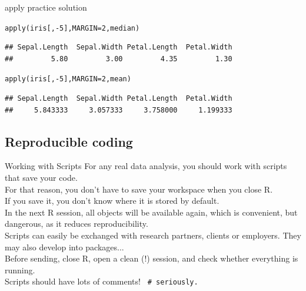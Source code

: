\documentclass[xcolor=table,           xcolor=dvipsnames]{beamer}\usepackage[]{graphicx}\usepackage[]{color}
\makeatletter
\newcommand{\hlnum}[1]{\textcolor[rgb]{0,0,0}{#1}}
\newcommand{\hlopt}[1]{\textcolor[rgb]{0,0,0}{#1}}
\newcommand{\hlstd}[1]{\textcolor[rgb]{0,0,0}{#1}}
\newcommand{\hlkwc}[1]{\textcolor[rgb]{1,0,1}{#1}}
\newcommand{\hlkwd}[1]{\textcolor[rgb]{0,0,1}{#1}}
\newenvironment{kframe}{%
 \def\at@end@of@kframe{}%
 \ifinner\ifhmode%
  \def\at@end@of@kframe{\end{minipage}}%
  \begin{minipage}{\columnwidth}%
 \fi\fi%
 \def\FrameCommand##1{\hskip\@totalleftmargin \hskip-\fboxsep
 \colorbox{shadecolor}{##1}\hskip-\fboxsep
     \hskip-\linewidth \hskip-\@totalleftmargin \hskip\columnwidth}%
 \MakeFramed {\advance\hsize-\width
   \@totalleftmargin\z@ \linewidth\hsize
   \@setminipage}}%
 {\par\unskip\endMakeFramed%
 \at@end@of@kframe}
\newenvironment{knitrout}{}{} %
\makeatother
\begin{document}

\begin{frame}[fragile]{apply practice solution}
\begin{knitrout}
\color{fgcolor}\begin{kframe}
\begin{alltt}
\hlkwd{apply}\hlstd{(iris[ ,}\hlopt{-}\hlnum{5}\hlstd{],} \hlkwc{MARGIN}\hlstd{=}\hlnum{2}\hlstd{, median)}
\end{alltt}
\begin{verbatim}
## Sepal.Length  Sepal.Width Petal.Length  Petal.Width 
##         5.80         3.00         4.35         1.30
\end{verbatim}
\end{kframe}
\end{knitrout}
\pause
\begin{knitrout}
\color{fgcolor}\begin{kframe}
\begin{alltt}
\hlkwd{apply}\hlstd{(iris[ ,}\hlopt{-}\hlnum{5}\hlstd{],} \hlkwc{MARGIN}\hlstd{=}\hlnum{2}\hlstd{, mean)}
\end{alltt}
\begin{verbatim}
## Sepal.Length  Sepal.Width Petal.Length  Petal.Width 
##     5.843333     3.057333     3.758000     1.199333
\end{verbatim}
\end{kframe}
\end{knitrout}
\end{frame}

\subsection{Reproducible coding}

\begin{frame}{Working with Scripts}
For any real data analysis, you should work with scripts that save your code.\\
\pause
For that reason, you don't have to save your workspace when you close R.\\
\pause
If you save it, you don't know where it is stored by default. \\ In the next R session, all objects will be available again, which is convenient, but dangerous, as it reduces reproducibility.\\
\pause
Scripts can easily be exchanged with research partners, clients or employers. They may also develop into packages...\\
\pause
Before sending, close R, open a clean (!) session, and check whether everything is running.\\
\pause
Scripts should have lots of comments! \pause \texttt{\textcolor[rgb]{0,0.392,0}{ \# seriously.}}

\end{frame}
\end{document}
